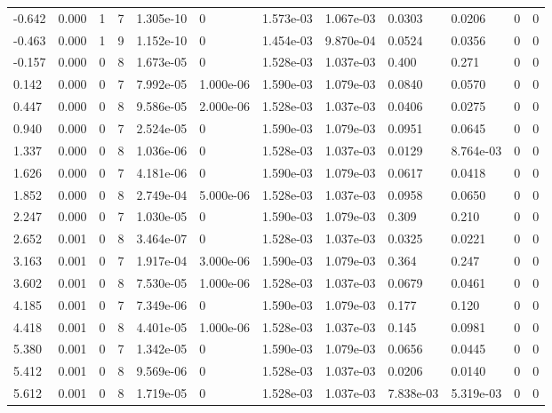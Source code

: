 \documentclass[preview]{standalone}
\begin{document}
{{\begin{tabular}{L{1.2cm}C{1.2cm} C{0.3cm}C{0.5cm} C{1.4cm}C{1.4cm} C{1.4cm}C{1.4cm} C{1.6cm}C{1.6cm} C{1.6cm}C{1.6cm}}
  -0.642  &  0.000  & 1     &  7 &  1.305e-10  & 0  &  1.573e-03&   1.067e-03& 0.0303 & 0.0206   &  0 & 0  \\ 
  -0.463  &  0.000  & 1     &  9 &  1.152e-10  & 0  &  1.454e-03&   9.870e-04& 0.0524 & 0.0356   &  0 & 0  \\ 
  -0.157  &  0.000  & 0     &  8 &  1.673e-05  & 0  &  1.528e-03&   1.037e-03& 0.400 & 0.271   &  0 & 0  \\ 
  0.142  &  0.000  & 0     &  7 &  7.992e-05  & 1.000e-06  &  1.590e-03&   1.079e-03& 0.0840 & 0.0570   &  0 & 0  \\ 
  0.447  &  0.000  & 0     &  8 &  9.586e-05  & 2.000e-06  &  1.528e-03&   1.037e-03& 0.0406 & 0.0275   &  0 & 0  \\ 
  0.940  &  0.000  & 0     &  7 &  2.524e-05  & 0  &  1.590e-03&   1.079e-03& 0.0951 & 0.0645   &  0 & 0  \\ 
  1.337  &  0.000  & 0     &  8 &  1.036e-06  & 0  &  1.528e-03&   1.037e-03& 0.0129 & 8.764e-03   &  0 & 0  \\ 
  1.626  &  0.000  & 0     &  7 &  4.181e-06  & 0  &  1.590e-03&   1.079e-03& 0.0617 & 0.0418   &  0 & 0  \\ 
  1.852  &  0.000  & 0     &  8 &  2.749e-04  & 5.000e-06  &  1.528e-03&   1.037e-03& 0.0958 & 0.0650   &  0 & 0  \\ 
  2.247  &  0.000  & 0     &  7 &  1.030e-05  & 0  &  1.590e-03&   1.079e-03& 0.309 & 0.210   &  0 & 0  \\ 
  2.652  &  0.001  & 0     &  8 &  3.464e-07  & 0  &  1.528e-03&   1.037e-03& 0.0325 & 0.0221   &  0 & 0  \\ 
  3.163  &  0.001  & 0     &  7 &  1.917e-04  & 3.000e-06  &  1.590e-03&   1.079e-03& 0.364 & 0.247   &  0 & 0  \\ 
  3.602  &  0.001  & 0     &  8 &  7.530e-05  & 1.000e-06  &  1.528e-03&   1.037e-03& 0.0679 & 0.0461   &  0 & 0  \\ 
  4.185  &  0.001  & 0     &  7 &  7.349e-06  & 0  &  1.590e-03&   1.079e-03& 0.177 & 0.120   &  0 & 0  \\ 
  4.418  &  0.001  & 0     &  8 &  4.401e-05  & 1.000e-06  &  1.528e-03&   1.037e-03& 0.145 & 0.0981   &  0 & 0  \\ 
  5.380  &  0.001  & 0     &  7 &  1.342e-05  & 0  &  1.590e-03&   1.079e-03& 0.0656 & 0.0445   &  0 & 0  \\ 
  5.412  &  0.001  & 0     &  8 &  9.569e-06  & 0  &  1.528e-03&   1.037e-03& 0.0206 & 0.0140   &  0 & 0  \\ 
  5.612  &  0.001  & 0     &  8 &  1.719e-05  & 0  &  1.528e-03&   1.037e-03& 7.838e-03 & 5.319e-03   &  0 & 0  \\ 

\end{tabular}}}
\end{document}
